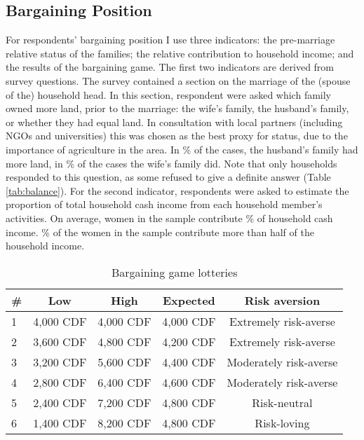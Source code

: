 \documentclass[10pt,a4paper]{scrartcl} %
\begin{document}
\subsection*{Bargaining Position}
For respondents' bargaining position I use three indicators: the pre-marriage relative status of the families; the relative contribution to household income; and the results of the bargaining game. The first two indicators are derived from survey questions. The survey contained a section on the marriage of the (spouse of the) household head. In this section, respondent were asked which family owned more land, prior to the marriage: the wife's family, the husband's family, or whether they had equal land. In consultation with local partners (including NGOs and universities) this was chosen as the best proxy for status, due to the importance of agriculture in the area. In \% of the cases, the husband's family had more land, in \% of the cases the wife's family did. Note that only  households responded to this question, as some refused to give a definite answer (Table \ref{tab:balance}). For the second indicator, respondents were asked to estimate the proportion of total household cash income from each household member's activities. On average, women in the sample contribute \% of household cash income. \% of the women in the sample contribute more than half of the household income.

\begin{table}[htb]
	\centering
	\caption{Bargaining game lotteries}
	\label{tab:bargaining}
	\begin{tabular}{l c c c c}
	\toprule
	\# & Low & High & Expected & Risk aversion \\
	\hline
	1 & 4,000 CDF & 4,000 CDF & 4,000 CDF & Extremely risk-averse \\
	2 & 3,600 CDF & 4,800 CDF & 4,200 CDF & Extremely risk-averse \\
	3 & 3,200 CDF & 5,600 CDF & 4,400 CDF & Moderately risk-averse \\
	4 & 2,800 CDF & 6,400 CDF & 4,600 CDF & Moderately risk-averse \\
	5 & 2,400 CDF & 7,200 CDF & 4,800 CDF & Risk-neutral \\
	6 & 1,400 CDF & 8,200 CDF & 4,800 CDF & Risk-loving \\ 
	\bottomrule
	\end{tabular}
\end{table}
\end{document}
